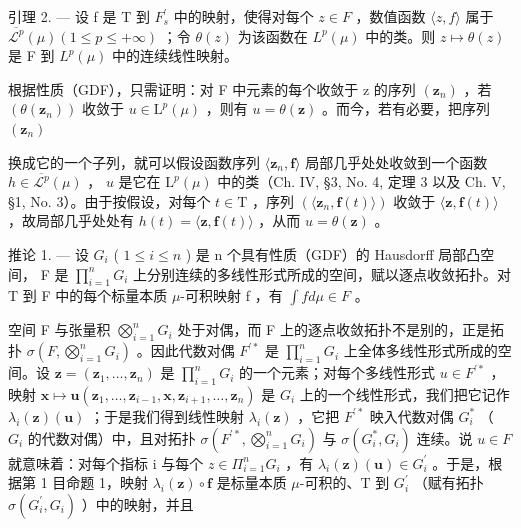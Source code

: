 引理 2. --- 设 f 是 T 到 \(F_{s}^{\prime}\) 中的映射，使得对每个 \(z \in F\) ，数值函数 \(\langle z, f \rangle\) 属于 \(\overline{\mathcal{L}^{p}}(\mu) (1 \leqslant p \leqslant +\infty)\) ；令 \(\theta(z)\) 为该函数在 \(L^{p}(\mu)\) 中的类。则 \(z \mapsto \theta(z)\) 是 F 到 \(L^{p}(\mu)\) 中的连续线性映射。

根据性质（GDF），只需证明：对 F 中元素的每个收敛于 z 的序列 \((\mathbf{z}_{n})\) ，若 \((\theta(\mathbf{z}_{n}))\) 收敛于 \(u \in \mathrm{L}^{p}(\mu)\) ，则有 \(u = \theta(\mathbf{z})\) 。而今，若有必要，把序列 \((\mathbf{z}_{n})\)

换成它的一个子列，就可以假设函数序列 \(\langle \mathbf{z}_n,\mathbf{f}\rangle\) 局部几乎处处收敛到一个函数 \(h\in \overline{\mathcal{L}^p} (\mu)\) ， \(u\) 是它在 \(\mathrm{L}^p (\mu)\) 中的类（Ch. IV, §3, No. 4, 定理 3 以及 Ch. V, §1, No. 3）。由于按假设，对每个 \(t\in \mathrm{T}\) ，序列 \((\langle \mathbf{z}_n,\mathbf{f}(t)\rangle)\) 收敛于 \(\langle \mathbf{z},\mathbf{f}(t)\rangle\) ，故局部几乎处处有 \(h(t) = \langle \mathbf{z},\mathbf{f}(t)\rangle\) ，从而 \(u = \theta (\mathbf{z})\) 。

推论 1. --- 设 \(G_{i}\) ( \(1 \leqslant i \leqslant n\) ) 是 n 个具有性质（GDF）的 Hausdorff 局部凸空间， F 是 \(\prod_{i=1}^{n} G_{i}\) 上分别连续的多线性形式所成的空间，赋以逐点收敛拓扑。对 T 到 F 中的每个标量本质 \(\mu\)-可积映射 f ，有 \(\int f d\mu \in F\) 。

空间 F 与张量积 \(\bigotimes_{i=1}^{n}G_{i}\) 处于对偶，而 F 上的逐点收敛拓扑不是别的，正是拓扑 \(\sigma(F,\bigotimes_{i=1}^{n}G_{i})\) 。因此代数对偶 \(F^{\prime*}\) 是 \(\prod_{i=1}^{n}G_{i}\) 上全体多线性形式所成的空间。设 \(\mathbf{z}=(\mathbf{z}_{1},\ldots,\mathbf{z}_{n})\) 是 \(\prod_{i=1}^{n}G_{i}\) 的一个元素；对每个多线性形式 \(u\in F^{\prime*}\) ，映射 \(\mathbf{x}\mapsto\mathbf{u}(\mathbf{z}_{1},\ldots,\mathbf{z}_{i-1},\mathbf{x},\mathbf{z}_{i+1},\ldots,\mathbf{z}_{n})\) 是 \(G_{i}\) 上的一个线性形式，我们把它记作 \(\lambda_{i}(\mathbf{z})(\mathbf{u})\) ；于是我们得到线性映射 \(\lambda_{i}(\mathbf{z})\) ，它把 \(F^{\prime*}\) 映入代数对偶 \(G_{i}^{*}\) （ \(G_{i}\) 的代数对偶）中，且对拓扑 \(\sigma(F^{\prime*},\bigotimes_{i=1}^{n}G_{i})\) 与 \(\sigma(G_{i}^{*},G_{i})\) 连续。说 \(u\in F\) 就意味着：对每个指标 i 与每个 \(z\in\Pi_{i=1}^{n}G_{i}\) ，有 \(\lambda_{i}(\mathbf{z})(\mathbf{u})\in G_{i}^{\prime}\) 。于是，根据第 1 目命题 1，映射 \(\lambda_{i}(\mathbf{z})\circ\mathbf{f}\) 是标量本质 \(\mu\)-可积的、T 到 \(G_{i}^{\prime}\) （赋有拓扑 \(\sigma(G_{i}^{\prime},G_{i})\) ）中的映射，并且

